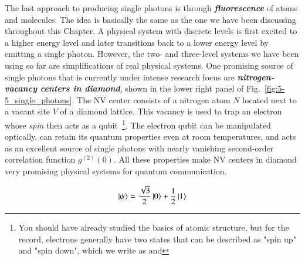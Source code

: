 The last approach to producing single photons is through \textit{\textbf{fluorescence}} of atoms and molecules.
The idea is basically the same as the one we have been discussing throughout this Chapter.
A physical system with discrete levels is first excited to a higher energy level and later transitions back to a lower energy level by emitting a single photon.
However, the two- and three-level systems we have been using so far are simplifications of real physical systems.
One promising source of single photons that is currently under intense research focus are \textit{\textbf{nitrogen-vacancy centers in diamond}}, shown in the lower right panel of Fig.~\ref{fig:5-5_single_photons}.
The NV center consists of a nitrogen atom $N$ located next to a vacant site $V$ of a diamond lattice.
This vacancy is used to trap an electron whose \emph{spin} then acts as a qubit~\footnote{You should have already studied the basics of atomic structure, but for the record, electrons generally have two states that can be described as "spin up" and "spin down", which we write as \ket{\uparrow} and \ket{\downarrow}}.
The electron qubit can be manipulated optically, can retain its quantum properties even at room temperatures, and acts as an excellent source of single photons with nearly vanishing second-order correlation function $g^{(2)}(0)$.
All these properties make NV centers in diamond very promising physical systems for quantum communication.


\newpage
\begin{exercises}
\begin{equation*}
\left| \psi \right\rangle = \frac{\sqrt{3}}{2}\left| 0 \right\rangle + \frac{1}{2}\left| 1 \right\rangle
\end{equation*}


\end{exercises}

